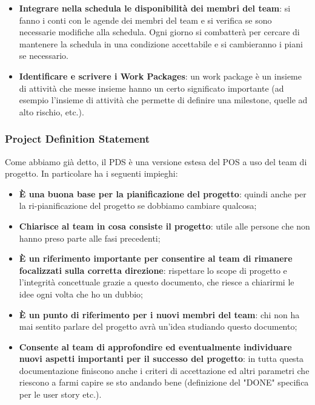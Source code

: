 \begin{itemize}
\begin{itemize}
		\item \textbf{Brainstorming}: si definisce come si organizza il processo di brainstorming.
		\item \textbf{Team meetings}: quali meeting faremo, quando e come.
	\end{itemize}
	\item \textbf{Integrare nella schedula le disponibilità dei membri del team}: si fanno i conti con le agende dei membri del team e si verifica se sono necessarie modifiche alla schedula. Ogni giorno si combatterà per cercare di mantenere la schedula in una condizione accettabile e si cambieranno i piani se necessario.
	\item \textbf{Identificare e scrivere i Work Packages}: un work package è un insieme di attività che messe insieme hanno un certo significato importante (ad esempio l'insieme di attività che permette di definire una milestone, quelle ad alto rischio, etc.).
\end{itemize}

\subsubsection{Project Definition Statement}
Come abbiamo già detto, il PDS è una versione estesa del POS a uso del team di progetto. In particolare ha i seguenti impieghi:
\begin{itemize}
	\item \textbf{\`E una buona base per la pianificazione del progetto}: quindi anche per la ri-pianificazione del progetto se dobbiamo cambiare qualcosa;
	\item \textbf{Chiarisce al team in cosa consiste il progetto}: utile alle persone che non hanno preso parte alle fasi precedenti;
	\item \textbf{\`E un riferimento importante per consentire al team di rimanere focalizzati sulla corretta direzione}: rispettare lo scope di progetto e l'integrità concettuale grazie a questo documento, che riesce a chiarirmi le idee ogni volta che ho un dubbio;
	\item \textbf{\`E un punto di riferimento per i nuovi membri del team}: chi non ha mai sentito parlare del progetto avrà un'idea studiando questo documento;
	\item \textbf{Consente al team di approfondire ed eventualmente individuare nuovi aspetti importanti per il successo del progetto}: in tutta questa documentazione finiscono anche i criteri di accettazione ed altri parametri che riescono a farmi capire se sto andando bene (definizione del "DONE" specifica per le user story etc.).
\end{itemize}
